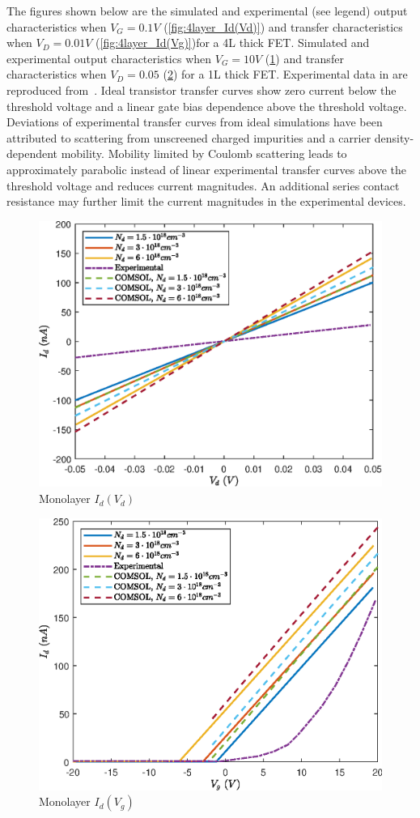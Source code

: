 \documentclass[12pt,a4paper,titlepage]{article}
\begin{document}
The figures shown below are the simulated and experimental (see legend) output characteristics when $V_G = 0.1 V$ (\ref{fig:4layer_Id(Vd)}) and transfer characteristics when $V_D = 0.01 V$ (\ref{fig:4layer_Id(Vg)})for a 4L thick FET. Simulated and experimental output characteristics when $V_G = 10 V$ (\ref{fig:monolayer_Id(Vd)}) and transfer characteristics when $V_D = 0.05$ (\ref{fig:monolayer_Id(Vg)}) for a 1L thick FET. Experimental data in are reproduced from~\cite{Wu:Ultrathin_MoS2}. Ideal transistor transfer curves show zero current below the threshold voltage and a linear gate bias dependence above the threshold voltage. Deviations of experimental transfer curves from ideal simulations have been attributed to scattering from unscreened charged impurities and a carrier density-dependent mobility. Mobility limited by Coulomb scattering leads to approximately parabolic instead of linear experimental transfer curves above the threshold voltage and reduces current magnitudes. An additional series contact resistance may further limit the current magnitudes in the experimental devices.

\begin{figure}[H]
	\centering
	\includegraphics[width=.8\textwidth]{Grafici/monolayer_Id(Vd).eps} 
	\caption{Monolayer $I_d(V_d)$}
	\label{fig:monolayer_Id(Vd)}
\end{figure}

\begin{figure}[H]
	\centering
	\includegraphics[width=.8\textwidth]{Grafici/monolayer_Id(Vg).eps} 
	\caption{Monolayer $I_d(V_g)$}
	\label{fig:monolayer_Id(Vg)}
\end{figure}
\end{document}
